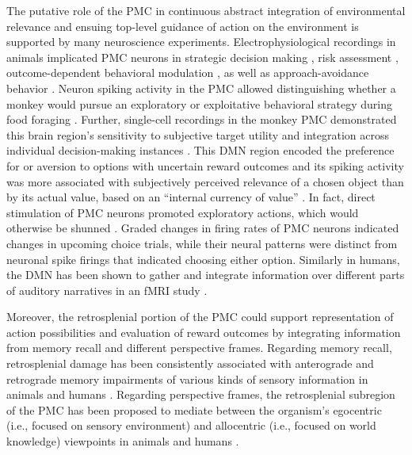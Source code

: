 \documentclass[10pt,letterpaper]{article}
\begin{document}
The putative role of the PMC in continuous abstract integration of
environmental relevance
and ensuing top-level guidance of action on the environment is supported
by many neuroscience experiments.
Electrophysiological recordings in animals implicated PMC neurons in
strategic decision making \citep{pearson2009neurons},
risk assessment \citep{mccoy2005risk},
outcome-dependent behavioral modulation \citep{hayden2009electrophysiological},
as well as approach-avoidance behavior
\citep{vann2009does}.
Neuron spiking activity in the PMC allowed distinguishing
whether a monkey would pursue an exploratory or exploitative
behavioral strategy during food foraging \citep{pearson2009neurons}.
Further, single-cell recordings in the monkey PMC
demonstrated this brain region's sensitivity to
subjective target utility \citep{mccoy2005risk} and integration
across individual decision-making instances \citep{pearson2009neurons}.
This DMN region encoded the
preference for or aversion to options with uncertain reward outcomes
and its spiking activity was more associated with
subjectively perceived relevance of a chosen object
than by its actual value,
based on an ``internal currency of value'' \citep{mccoy2005risk}.
In fact, direct stimulation of PMC neurons
promoted exploratory actions,
which would otherwise be shunned \citep{hayden2008stim}.
Graded changes in firing rates of PMC neurons
indicated changes in upcoming choice trials, while their neural patterns were
distinct from neuronal spike firings that indicated choosing either option.
Similarly in humans,
the DMN has been shown to gather and integrate information
over different parts of auditory narratives in an fMRI study
\citep{simony2016dynamic}.


Moreover, the retrosplenial portion of the PMC could support
representation of action possibilities
and evaluation of reward outcomes by integrating
information from memory recall and different perspective frames.
Regarding memory recall, retrosplenial damage has been
consistently associated with anterograde and retrograde memory impairments
of various kinds of sensory information
in animals and humans
\citep{vann2009does}.
Regarding perspective frames, the retrosplenial subregion of the PMC has been
proposed to mediate between the organism's egocentric
(i.e., focused on sensory environment) and
allocentric (i.e., focused on world knowledge) viewpoints
in animals and humans
\citep{epstein2008parahippocampal, burgess2008spatial, valiquette2007different}.
\end{document}
